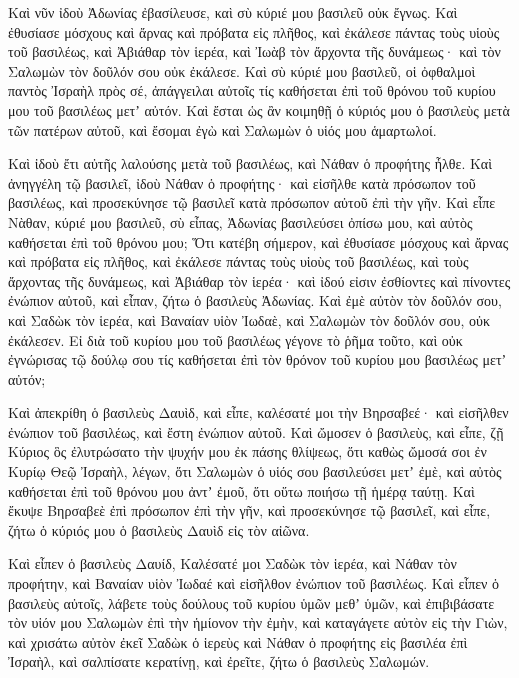 {Καὶ νῦν ἰδοὺ Ἀδωνίας ἐβασίλευσε, καὶ σὺ κύριέ μου βασιλεῦ οὐκ ἔγνως.
Καὶ ἐθυσίασε μόσχους καὶ ἄρνας καὶ πρόβατα εἰς πλῆθος, καὶ ἐκάλεσε πάντας τοὺς υἱοὺς τοῦ βασιλέως, καὶ Ἀβιάθαρ τὸν ἱερέα, καὶ Ἰωὰβ τὸν ἄρχοντα τῆς δυνάμεως· καὶ τὸν Σαλωμὼν τὸν δοῦλόν σου οὐκ ἐκάλεσε.
Καὶ σὺ κύριέ μου βασιλεῦ, οἱ ὀφθαλμοὶ παντὸς Ἰσραὴλ πρὸς σέ, ἀπάγγειλαι αὐτοῖς τίς καθήσεται ἐπὶ τοῦ θρόνου τοῦ κυρίου μου τοῦ βασιλέως μετʼ αὐτόν.
Καὶ ἔσται ὡς ἂν κοιμηθῇ ὁ κύριός μου ὁ βασιλεὺς μετὰ τῶν πατέρων αὐτοῦ, καὶ ἔσομαι ἐγὼ καὶ Σαλωμὼν ὁ υἱός μου ἁμαρτωλοί.
\par }{\PP {}Καὶ ἰδοὺ ἔτι αὐτῆς λαλούσης μετὰ τοῦ βασιλέως, καὶ Νάθαν ὁ προφήτης ἦλθε.
Καὶ ἀνηγγέλη τῷ βασιλεῖ, ἰδοὺ Νάθαν ὁ προφήτης· καὶ εἰσῆλθε κατὰ πρόσωπον τοῦ βασιλέως, καὶ προσεκύνησε τῷ βασιλεῖ κατὰ πρόσωπον αὐτοῦ ἐπὶ τὴν γῆν.
Καὶ εἶπε Νὰθαν, κύριέ μου βασιλεῦ, σὺ εἶπας, Ἀδωνίας βασιλεύσει ὀπίσω μου, καὶ αὐτὸς καθήσεται ἐπὶ τοῦ θρόνου μου;
Ὅτι κατέβη σήμερον, καὶ ἐθυσίασε μόσχους καὶ ἄρνας καὶ πρόβατα εἰς πλῆθος, καὶ ἐκάλεσε πάντας τοὺς υἱοὺς τοῦ βασιλέως, καὶ τοὺς ἄρχοντας τῆς δυνάμεως, καὶ Ἀβιάθαρ τὸν ἱερέα· καὶ ἰδού εἰσιν ἐσθίοντες καὶ πίνοντες ἐνώπιον αὐτοῦ, καὶ εἶπαν, ζήτω ὁ βασιλεὺς Ἀδωνίας.
Καὶ ἐμὲ αὐτὸν τὸν δοῦλόν σου, καὶ Σαδὼκ τὸν ἱερέα, καὶ Βαναίαν υἱὸν Ἰωδαὲ, καὶ Σαλωμὼν τὸν δοῦλόν σου, οὐκ ἐκάλεσεν.
Εἰ διὰ τοῦ κυρίου μου τοῦ βασιλέως γέγονε τὸ ῥῆμα τοῦτο, καὶ οὐκ ἐγνώρισας τῷ δούλῳ σου τίς καθήσεται ἐπὶ τὸν θρόνον τοῦ κυρίου μου βασιλέως μετʼ αὐτόν;
\par }{\PP {}Καὶ ἀπεκρίθη ὁ βασιλεὺς Δαυὶδ, καὶ εἶπε, καλέσατέ μοι τὴν Βηρσαβεέ· καὶ εἰσῆλθεν ἐνώπιον τοῦ βασιλέως, καὶ ἔστη ἐνώπιον αὐτοῦ.
Καὶ ὤμοσεν ὁ βασιλεὺς, καὶ εἶπε, ζῇ Κύριος ὃς ἐλυτρώσατο τὴν ψυχήν μου ἐκ πάσης θλίψεως,
ὅτι καθὼς ὤμοσά σοι ἐν Κυρίῳ Θεῷ Ἰσραὴλ, λέγων, ὅτι Σαλωμὼν ὁ υἱός σου βασιλεύσει μετʼ ἐμὲ, καὶ αὐτὸς καθήσεται ἐπὶ τοῦ θρόνου μου ἀντʼ ἐμοῦ, ὅτι οὕτω ποιήσω τῇ ἡμέρᾳ ταύτῃ.
Καὶ ἔκυψε Βηρσαβεὲ ἐπὶ πρόσωπον ἐπὶ τὴν γῆν, καὶ προσεκύνησε τῷ βασιλεῖ, καὶ εἶπε, ζήτω ὁ κύριός μου ὁ βασιλεὺς Δαυὶδ εἰς τὸν αἰῶνα.
\par }{\PP {}Καὶ εἶπεν ὁ βασιλεὺς Δαυίδ, Καλέσατέ μοι Σαδὼκ τὸν ἱερέα, καὶ Νάθαν τὸν προφήτην, καὶ Βαναίαν υἱὸν Ἰωδαέ καὶ εἰσῆλθον ἐνώπιον τοῦ βασιλέως.
Καὶ εἶπεν ὁ βασιλεὺς αὐτοῖς, λάβετε τοὺς δούλους τοῦ κυρίου ὑμῶν μεθʼ ὑμῶν, καὶ ἐπιβιβάσατε τὸν υἱόν μου Σαλωμὼν ἐπὶ τὴν ἡμίονον τὴν ἐμὴν, καὶ καταγάγετε αὐτὸν εἰς τὴν Γιὼν,
καὶ χρισάτω αὐτὸν ἐκεῖ Σαδὼκ ὁ ἱερεὺς καὶ Νάθαν ὁ προφήτης εἰς βασιλέα ἐπὶ Ἰσραὴλ, καὶ σαλπίσατε κερατίνῃ, καὶ ἐρεῖτε, ζήτω ὁ βασιλεὺς Σαλωμών.
}
